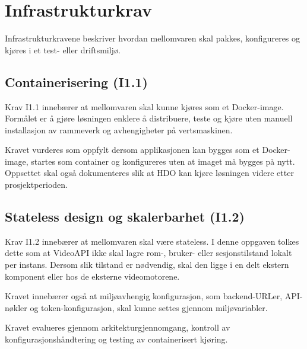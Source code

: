 \section{Infrastrukturkrav}
\label{sec:krav-infrastruktur}

Infrastrukturkravene beskriver hvordan mellomvaren skal pakkes, 
konfigureres og kjøres i et test- eller driftsmiljø.

\subsection{Containerisering (I1.1)}
\label{subsec:krav-i11}

Krav I1.1 innebærer at mellomvaren skal kunne kjøres som et 
Docker-image. Formålet er å gjøre løsningen enklere å distribuere, 
teste og kjøre uten manuell installasjon av rammeverk og avhengigheter 
på vertsmaskinen.

Kravet vurderes som oppfylt dersom applikasjonen kan bygges som et 
Docker-image, startes som container og konfigureres uten at imaget må 
bygges på nytt. Oppsettet skal også dokumenteres slik at HDO kan kjøre 
løsningen videre etter prosjektperioden.

\subsection{Stateless design og skalerbarhet (I1.2)}
\label{subsec:krav-i12}

Krav I1.2 innebærer at mellomvaren skal være stateless. I denne 
oppgaven tolkes dette som at VideoAPI ikke skal lagre rom-, bruker- 
eller sesjonstilstand lokalt per instans. Dersom slik tilstand er 
nødvendig, skal den ligge i en delt ekstern komponent eller hos de 
eksterne videomotorene.

Kravet innebærer også at miljøavhengig konfigurasjon, som backend-URLer, 
API-nøkler og token-konfigurasjon, skal kunne settes gjennom 
miljøvariabler.

Kravet evalueres gjennom arkitekturgjennomgang, kontroll av 
konfigurasjonshåndtering og testing av containerisert kjøring. 
